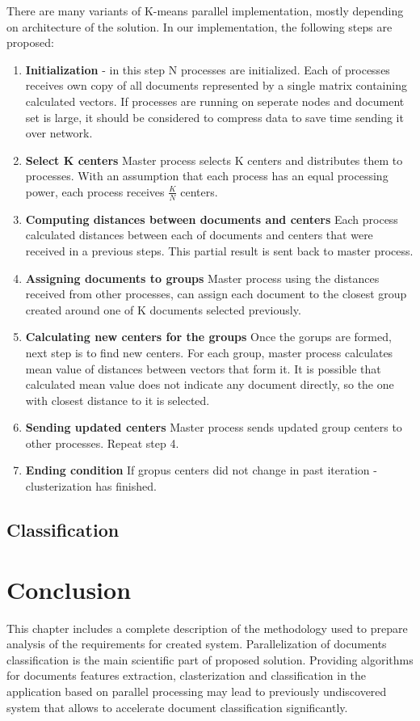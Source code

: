 There are many variants of K-means parallel implementation, mostly depending on architecture of the solution. In our implementation, the following steps are proposed:

\begin{enumerate}
	\item \textbf{Initialization} - in this step N processes are initialized.
	Each of processes receives own copy of all documents represented by a single matrix containing calculated vectors. If processes are running on seperate nodes and document set is large, it should be considered to compress data to save time sending it over network.
	
	\item \textbf{Select K centers}
	Master process selects K centers and distributes them to processes. With an assumption that each process has an equal processing power, each process receives \(\frac{K}{N}\) centers.
	
	\item \textbf{Computing distances between documents and centers}
	Each process calculated distances between each of documents and centers that were received in a previous steps. This partial result is sent back to master process.
	
	\item \textbf{Assigning documents to groups}
	Master process using the distances received from other processes, can assign each document to the closest group created around one of K documents selected previously.
	
	\item \textbf{Calculating new centers for the groups}
	Once the gorups are formed, next step is to find new centers. For each group, master process calculates mean value of distances between vectors that form it. It is possible that calculated mean value does not indicate any document directly, so the one with closest distance to it is selected.
	
	\item \textbf{Sending updated centers}
	Master process sends updated group centers to other processes. Repeat step 4.
	
	\item \textbf{Ending condition}
	If gropus centers did not change in past iteration - clusterization has finished.
\end{enumerate}

\subsection{Classification}

\section{Conclusion}
This chapter includes a complete description of the methodology used to prepare analysis of the requirements for created system. Parallelization of documents classification is the main scientific part of proposed solution. Providing algorithms for documents features extraction, clasterization and classification in the application based on parallel processing may lead to previously undiscovered system that allows to accelerate document classification significantly. 